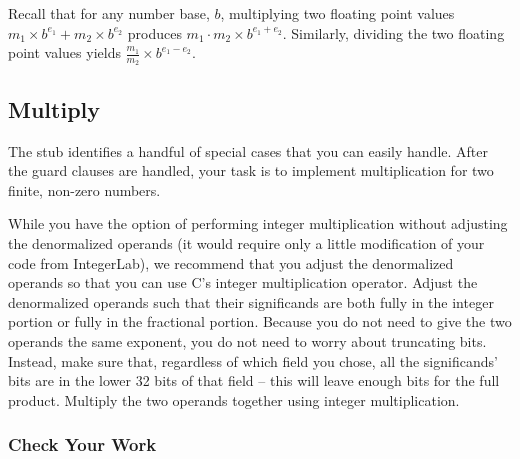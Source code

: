 Recall that for any number base, $b$, multiplying two floating point values $m_1 \times b^{e_1} + m_2 \times b^{e_2}$ produces $m_1 \cdot m_2 \times b^{e_1 + e_2}$.
Similarly, dividing the two floating point values yields $\frac{m_1}{m_2} \times b^{e_1 - e_2}$.

\subsection{Multiply}

The  stub identifies a handful of special cases that you can easily handle.
After the guard clauses are handled, your task is to implement multiplication for two finite, non-zero numbers.

While you have the option of performing integer multiplication without adjusting the denormalized operands (it would require only a little modification of your code from IntegerLab), we recommend that you adjust the denormalized operands so that you can use C's integer multiplication operator.
Adjust the denormalized operands such that their significands are both fully in the integer portion or fully in the fractional portion.
Because you do not need to give the two operands the same exponent, you do not need to worry about truncating bits.
Instead, make sure that, regardless of which field you chose, all the significands' bits are in the lower 32 bits of that field -- this will leave enough bits for the full product.
Multiply the two operands together using integer multiplication.

\subsubsection*{Check Your Work}


